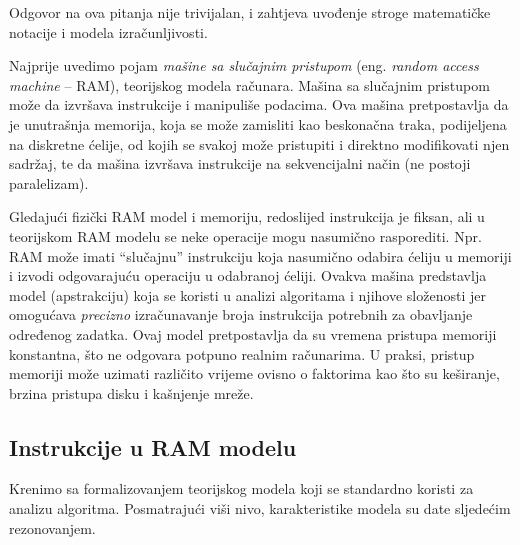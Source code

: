 Odgovor na ova pitanja nije trivijalan, i zahtjeva uvođenje stroge matema\-tičke notacije i modela izračunljivosti. 

Najprije uvedimo pojam \textit{mašine sa slučajnim pristupom} (eng. \textit{random access machine} -- RAM), teorijskog modela računara.  Mašina sa slučajnim pristupom može da izvršava instrukcije i manipuliše podacima. Ova mašina pretpostavlja da je unutrašnja memorija, koja se može zamisliti kao beskona\-čna traka,   
podijeljena na diskretne ćelije, od kojih se svakoj može pristupiti i direktno modifikovati njen sadržaj, te da mašina izvršava instrukcije na sekvencijalni način (ne postoji paralelizam).

Gledajući fizički RAM model i memoriju, redoslijed instrukcija je fiksan, ali u teorijskom RAM modelu se neke operacije mogu nasumično rasporediti. Npr. RAM može imati ``slučajnu''  instrukciju koja nasumično odabira ćeliju u memoriji i izvodi odgovarajuću operaciju u odabranoj ćeliji. Ovakva mašina predstavlja model (apstrakciju) koja se koristi u analizi algoritama i njihove složenosti jer omogućava \textit{precizno} izračunavanje broja instrukcija potrebnih za obavljanje određenog zadatka. Ovaj model pretpostavlja da su vremena pristupa memoriji konstantna, što ne odgovara potpuno realnim računarima. U praksi, pristup memoriji može uzimati različito vrijeme ovisno o faktorima kao što su keširanje, brzina pristupa disku i kašnjenje mreže.

\subsection{Instrukcije u RAM modelu}
Krenimo sa formalizovanjem teorijskog modela koji 
se standardno koristi za analizu algoritma.  Posmatrajući viši nivo,   karakteristike modela su date sljedećim rezonovanjem. 

